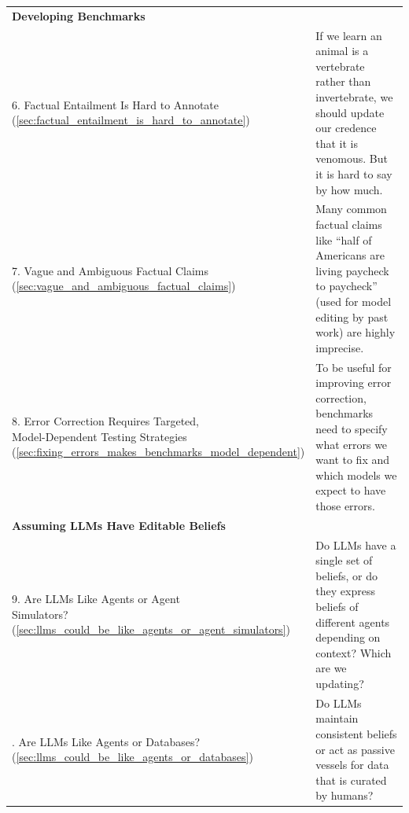 \documentclass[11pt,a4paper]{article}
\begin{document}
\begin{table}[h!]
\begin{tabular}{p{6cm} p{7cm}}
\addlinespace[1pt]
\midrule
\textbf{Developing Benchmarks} \\
\hspace{4pt}6. \makecell[tl]{Factual Entailment Is Hard to Annotate \\ (\autoref{sec:factual_entailment_is_hard_to_annotate})} & \hspace{-6pt}\raisebox{1pt}{\scalebox{.7}{\textbullet}} If we learn an animal is a vertebrate rather than invertebrate, we should update our credence that it is venomous. But it is hard to say by how much. \\
\addlinespace[1pt]
\hspace{4pt}7. \makecell[tl]{Vague and Ambiguous Factual Claims \\ (\autoref{sec:vague_and_ambiguous_factual_claims})} & \hspace{-6pt}\raisebox{1pt}{\scalebox{.7}{\textbullet}} Many common factual claims like ``half of Americans are living paycheck to paycheck'' (used for model editing by past work) are highly imprecise. \\
\addlinespace[1pt]
\hspace{4pt}8. \makecell[tl]{Error Correction Requires Targeted,\\ Model-Dependent Testing Strategies \\  (\autoref{sec:fixing_errors_makes_benchmarks_model_dependent})} & \hspace{-6pt}\raisebox{1pt}{\scalebox{.7}{\textbullet}} To be useful for improving error correction, benchmarks need to specify what errors we want to fix and which models we expect to have those errors.\\
\addlinespace[1pt]
\midrule
\textbf{Assuming LLMs Have Editable Beliefs} \\
\hspace{4pt}9. \makecell[tl]{Are LLMs Like Agents or Agent \\ Simulators? \\ (\autoref{sec:llms_could_be_like_agents_or_agent_simulators})} & \hspace{-6pt}\raisebox{1pt}{\scalebox{.7}{\textbullet}} Do LLMs have a single set of beliefs, or do they express beliefs of different agents depending on context? Which are we updating? \\
\addlinespace[1pt]
10. \makecell[tl]{Are LLMs Like Agents or Databases? \\ (\autoref{sec:llms_could_be_like_agents_or_databases})} & \hspace{-6pt}\raisebox{1pt}{\scalebox{.7}{\textbullet}} Do LLMs maintain consistent beliefs or act as passive vessels for data that is curated by humans? \\

\end{tabular}
\end{table}
\end{document}
